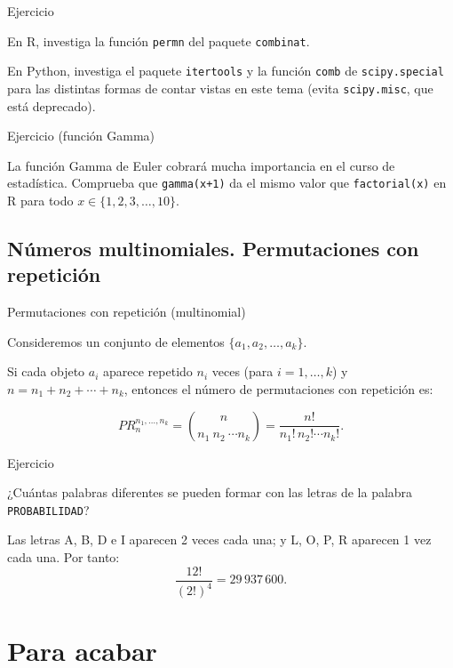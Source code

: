 \documentclass[
  letterpaper,
  DIV=11,
  numbers=noendperiod]{scrreprt}
\begin{document}
\begin{Ejemplo}{Ejercicio}{}

En R, investiga la función \texttt{permn} del paquete \texttt{combinat}.

En Python, investiga el paquete \texttt{itertools} y la función
\texttt{comb} de \texttt{scipy.special} para las distintas formas de
contar vistas en este tema (evita \texttt{scipy.misc}, que está
deprecado).

\end{Ejemplo}

\begin{Ejemplo}{Ejercicio (función Gamma)}{}

La función Gamma de Euler cobrará mucha importancia en el curso de
estadística. Comprueba que \texttt{gamma(x+1)} da el mismo valor que
\texttt{factorial(x)} en R para todo \(x\in\{1,2,3,\ldots,10\}\).

\end{Ejemplo}

\subsection{Números multinomiales. Permutaciones con
repetición}\label{nuxfameros-multinomiales.-permutaciones-con-repeticiuxf3n}

\begin{Definicion}{Permutaciones con repetición (multinomial)}{}

Consideremos un conjunto de elementos \(\{a_1, a_2, \ldots, a_k\}\).

Si cada objeto \(a_i\) aparece repetido \(n_i\) veces (para
\(i=1,\ldots,k\)) y \(n=n_1+n_2+\cdots+n_k\), entonces el número de
permutaciones con repetición es:

\[
PR_n^{n_1,\ldots,n_k}
= \binom{n}{n_1\ n_2\ \cdots n_k}
= \frac{n!}{n_1!\,n_2!\cdots n_k!}.
\]

\end{Definicion}

\begin{Ejemplo}{Ejercicio}{}

¿Cuántas palabras diferentes se pueden formar con las letras de la
palabra \texttt{PROBABILIDAD}?

Las letras A, B, D e I aparecen 2 veces cada una; y L, O, P, R aparecen
1 vez cada una. Por tanto: \[
\frac{12!}{(2!)^4}=29\,937\,600.
\]

\end{Ejemplo}

\section{Para acabar}\label{para-acabar}
\end{document}
